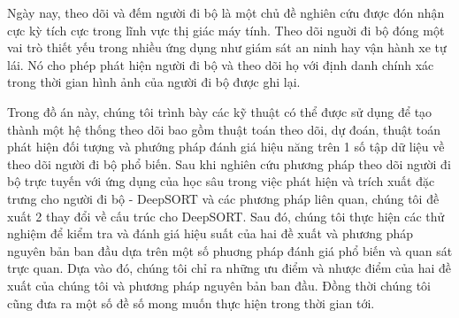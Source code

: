 \begin{vnabstract}
\hspace{0.45cm}Ngày nay, theo dõi và đếm người đi bộ là một chủ đề nghiên cứu được đón nhận cực kỳ tích cực trong lĩnh vực thị giác máy tính. 
Theo dõi nguời đi bộ đóng một vai trò thiết yếu trong nhiều ứng dụng như giám sát an ninh hay vận hành xe tự lái. 
Nó cho phép phát hiện người đi bộ và theo dõi họ với định danh chính xác trong thời gian hình ảnh của người đi bộ được ghi lại.
\par Trong đồ án này, chúng tôi trình bày các kỹ thuật có thể được sử dụng để tạo thành một hệ thống theo dõi bao gồm
thuật toán theo dõi, dự đoán, thuật toán phát hiện đối tượng và phướng pháp đánh giá hiệu năng trên 1 số tập dữ liệu về theo dõi người đi bộ phổ biến.
Sau khi nghiên cứu phương pháp theo dõi người đi bộ trực tuyến với ứng dụng của học sâu trong việc phát hiện và trích xuất đặc trưng cho người đi bộ
- DeepSORT và các phương pháp liên quan, chúng tôi đề xuất 2 thay đổi về cấu trúc cho DeepSORT. Sau đó, chúng tôi thực hiện các thử nghiệm để kiểm tra và đánh giá hiệu suất của hai đề xuất và
 phương pháp nguyên bản ban đầu dựa trên một số phuơng pháp đánh giá phổ biến và quan sát trực quan.
 Dựa vào đó, chúng tôi chỉ ra những ưu điểm và nhược điểm của hai đề xuất của chúng tôi và phương pháp nguyên bản ban đầu. Đồng thời chúng tôi cũng đưa ra một số đề số mong muốn thực hiện trong thời gian tới.




\end{vnabstract}